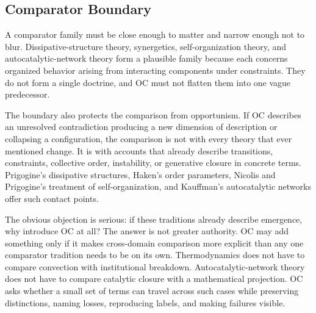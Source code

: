 \documentclass[11pt,a4paper,openany]{book}
\begin{document}
\subsection{Comparator Boundary}
A comparator family must be close enough to matter and narrow enough not to blur. Dissipative-structure theory, synergetics, self-organization theory, and autocatalytic-network theory form a plausible family because each concerns organized behavior arising from interacting components under constraints. They do not form a single doctrine, and OC must not flatten them into one vague predecessor. \cite{prigogine_dissipative,haken_synergetics}\par
The boundary also protects the comparison from opportunism. If OC describes an unresolved contradiction producing a new dimension of description or collapsing a configuration, the comparison is not with every theory that ever mentioned change. It is with accounts that already describe transitions, constraints, collective order, instability, or generative closure in concrete terms. Prigogine's dissipative structures, Haken's order parameters, Nicolis and Prigogine's treatment of self-organization, and Kauffman's autocatalytic networks offer such contact points.\par
The obvious objection is serious: if these traditions already describe emergence, why introduce OC at all? The answer is not greater authority. OC may add something only if it makes cross-domain comparison more explicit than any one comparator tradition needs to be on its own. Thermodynamics does not have to compare convection with institutional breakdown. Autocatalytic-network theory does not have to compare catalytic closure with a mathematical projection. OC asks whether a small set of terms can travel across such cases while preserving distinctions, naming losses, reproducing labels, and making failures visible.\par
\end{document}
